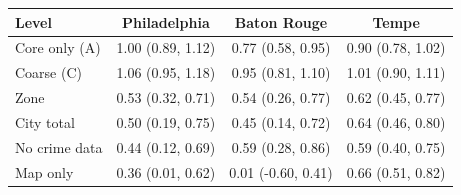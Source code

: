 \begin{tabular}{lccc}
\toprule
Level & Philadelphia & Baton Rouge & Tempe \\
\midrule
Core only (A) & 1.00 (0.89, 1.12) & 0.77 (0.58, 0.95) & 0.90 (0.78, 1.02) \\
Coarse (C) & 1.06 (0.95, 1.18) & 0.95 (0.81, 1.10) & 1.01 (0.90, 1.11) \\
\midrule
Zone & 0.53 (0.32, 0.71) & 0.54 (0.26, 0.77) & 0.62 (0.45, 0.77) \\
City total & 0.50 (0.19, 0.75) & 0.45 (0.14, 0.72) & 0.64 (0.46, 0.80) \\
\midrule
No crime data & 0.44 (0.12, 0.69) & 0.59 (0.28, 0.86) & 0.59 (0.40, 0.75) \\
Map only & 0.36 (0.01, 0.62) & 0.01 (-0.60, 0.41) & 0.66 (0.51, 0.82) \\
\bottomrule
\end{tabular}
